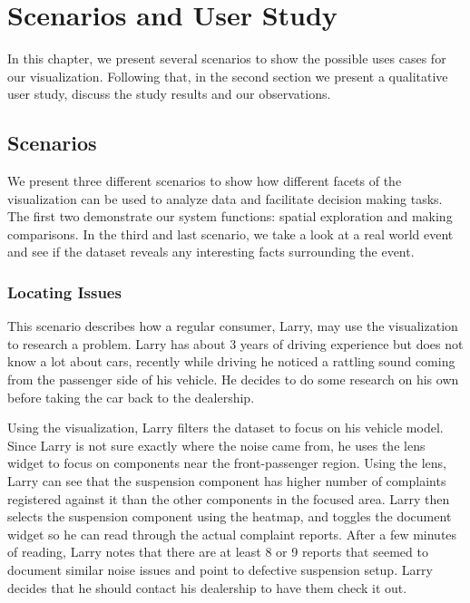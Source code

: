 
\chapter{Scenarios and User Study}
In this chapter, we present several scenarios to show the possible uses cases
for our visualization. Following that, in the second section we present a
qualitative user study, discuss the study results and our observations.

\section{Scenarios}
We present three different scenarios to show how different facets of the
visualization can be used to analyze data and facilitate decision making tasks.
The first two demonstrate our system functions: spatial exploration and making
comparisons. In the third and last scenario, we take a look at a real world
event and see if the dataset reveals any interesting facts surrounding the
event.

 
\subsection{Locating Issues}
This scenario describes how a regular consumer, Larry, may use the 
visualization to research a problem. Larry has about 3 years of driving 
experience but does not know a lot about cars, recently while driving he 
noticed a rattling sound coming from the passenger side of his vehicle. 
He decides to do some research on his own before taking the car back 
to the dealership.

Using the visualization, Larry filters the dataset to focus on his
vehicle model. Since Larry is not sure exactly where the noise came from, 
he uses the lens widget to focus on components near the front-passenger 
region. Using the lens, Larry can see that the suspension component has 
higher number of complaints registered against it than the other components 
in the focused area. Larry then selects the suspension component using 
the heatmap, and toggles the document widget so he can read through the 
actual complaint reports. After a few minutes of reading, Larry notes that
there are at least 8 or 9 reports that seemed to document similar noise 
issues and point to defective suspension setup. Larry decides that he 
should contact his dealership to have them check it out.

